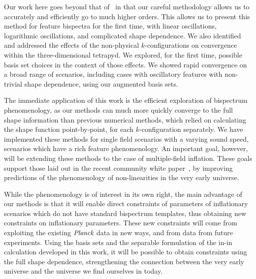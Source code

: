 Our work here goes beyond that of~\cite{Funakoshi} in that our careful methodology
allows us to accurately and efficiently go to much higher orders.
This allows us to present this method for feature bispectra for the first time,
with linear oscillations, logarithmic oscillations, and complicated shape dependence.
We also identified and addressed the effects
of the non-physical $k$-configurations on convergence within the three-dimensional tetrapyd.
We explored, for the first time, possible basis set choices in the context of those effects.
We showed rapid convergence on a broad range of scenarios,
including cases with oscillatory features with non-trivial shape dependence,
using our augmented basis sets.


The immediate application of this work is the efficient exploration of
bispectrum phenomenology, as our methods can much more quickly
converge to the full shape information than previous numerical methods,
which relied on calculating the shape function point-by-point, for each $k$-configuration separately.
We have implemented these methods for single field scenarios
with a varying sound speed, scenarios which
have a rich feature phenomenology. An important goal, however, will be extending
these methods to the case of multiple-field inflation.
These goals support those laid out in the recent community white paper~\cite{astro2020_png},
by improving predictions of the phenomenology of non-linearities in the very early universe.

While the phenomenology is of interest in its own right,
the main advantage of our methods is that it will enable
direct constraints of parameters of inflationary scenarios which do not have
standard bispectrum templates, thus obtaining new constraints on inflationary parameters.
These new constraints will come from exploiting the existing $\textit{Planck}$ data in
new ways, and from data from future experiments.
Using the basis sets and the separable formulation of the in-in calculation developed in this work,
it will be possible to obtain constraints using the full shape dependence,
strengthening the connection between the very early universe and the universe we
find ourselves in today.
